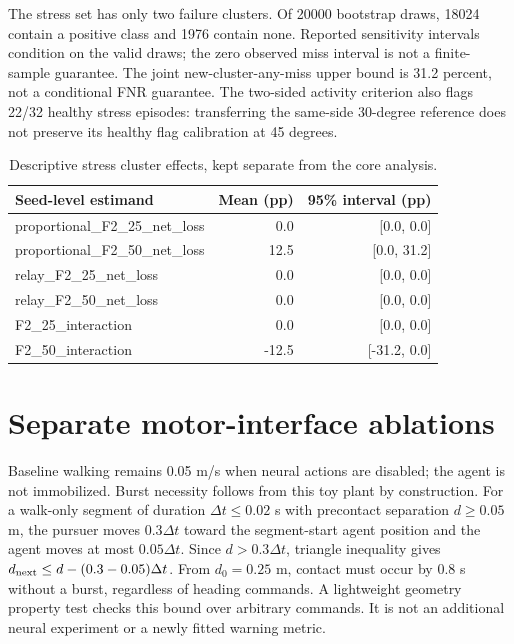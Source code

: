 \documentclass[10pt,letterpaper]{article}
\begin{document}
The stress set has only two failure clusters. Of 20000 bootstrap draws, 18024 contain a positive class and 1976 contain none. Reported sensitivity intervals condition on the valid draws; the zero observed miss interval is not a finite-sample guarantee. The joint new-cluster-any-miss upper bound is 31.2 percent, not a conditional FNR guarantee. The two-sided activity criterion also flags 22/32 healthy stress episodes: transferring the same-side 30-degree reference does not preserve its healthy flag calibration at 45 degrees.

\begin{table}[H]
\centering\small
\caption{Descriptive stress cluster effects, kept separate from the core analysis.}
\begin{tabular}{lrr}
\toprule
Seed-level estimand & Mean (pp) & 95\% interval (pp)\\
\midrule
proportional\_F2\_25\_net\_loss & 0.0 & [0.0, 0.0]\\
proportional\_F2\_50\_net\_loss & 12.5 & [0.0, 31.2]\\
relay\_F2\_25\_net\_loss & 0.0 & [0.0, 0.0]\\
relay\_F2\_50\_net\_loss & 0.0 & [0.0, 0.0]\\
F2\_25\_interaction & 0.0 & [0.0, 0.0]\\
F2\_50\_interaction & -12.5 & [-31.2, 0.0]\\
\bottomrule
\end{tabular}
\end{table}

\section{Separate motor-interface ablations}

Baseline walking remains 0.05 m/s when neural actions are disabled; the agent is not immobilized. Burst necessity follows from this toy plant by construction. For a walk-only segment of duration $\Delta t\leq0.02$ s with precontact separation $d\geq0.05$ m, the pursuer moves $0.3\Delta t$ toward the segment-start agent position and the agent moves at most $0.05\Delta t$. Since $d>0.3\Delta t$, triangle inequality gives $d_{\rm next}\leq d-(0.3-0.05)\Delta t$. From $d_0=0.25$ m, contact must occur by 0.8 s without a burst, regardless of heading commands. A lightweight geometry property test checks this bound over arbitrary commands. It is not an additional neural experiment or a newly fitted warning metric.
\end{document}
